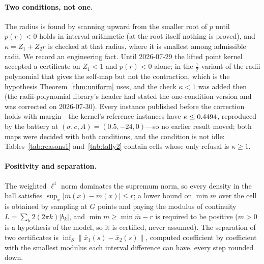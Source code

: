 \documentclass[11pt]{article}
\theoremstyle{definition}
\begin{document}
\paragraph{Two conditions, not one.} The radius is found by scanning upward from the smaller root of $p$ until $p(r)<0$ holds in interval arithmetic (at the root itself nothing is proved), and $\kappa=Z_1+Z_2r$ is checked at that radius, where it is smallest among admissible radii. We record an engineering fact. Until 2026-07-29 the lifted point kernel accepted a certificate on $Z_1<1$ and $p(r)<0$ alone; in the $\tfrac12$-variant of the radii polynomial that gives the self-map but not the contraction, which is the hypothesis Theorem~\ref{thm:uniform} uses, and the check $\kappa<1$ was added then (the radii-polynomial library's header had stated the one-condition version and was corrected on 2026-07-30). Every instance published before the correction holds with margin---the kernel's reference instances have $\kappa\le0.4494$, reproduced by the battery at $(\sigma,c,A)=(0.5,-24,0)$---so no earlier result moved; both maps were decided with both conditions, and the condition is not idle: Tables~\ref{tab:reasons1} and~\ref{tab:tally2} contain cells whose only refusal is $\kappa\ge1$.

\paragraph{Positivity and separation.} The weighted $\ell^1$ norm dominates the supremum norm, so every density in the ball satisfies $\sup_x|m(x)-\bar m(x)|\le r$; a lower bound on $\min\bar m$ over the cell is obtained by sampling at $G$ points and paying the modulus of continuity $L=\sum_k 2(2\pi k)|b_k|$, and $\min m\ge\min\bar m-r$ is required to be positive ($m>0$ is a hypothesis of the model, so it is certified, never assumed). The separation of two certificates is $\inf_S\|\bar x_1(s)-\bar x_2(s)\|$, computed coefficient by coefficient with the smallest modulus each interval difference can have, every step rounded down.
\end{document}
